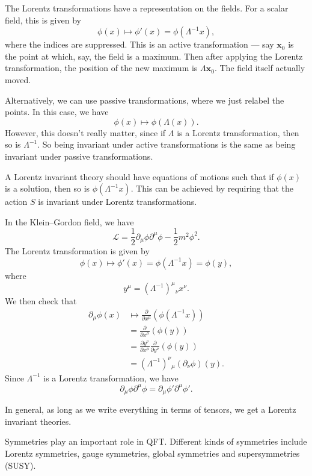 \documentclass[a4paper]{article}
\begin{document}
The Lorentz transformations have a representation on the fields. For a scalar field, this is given by
\[
  \phi(x) \mapsto \phi'(x) = \phi(\Lambda^{-1}x),
\]
where the indices are suppressed. This is an active transformation --- say $\mathbf{x}_0$ is the point at which, say, the field is a maximum. Then after applying the Lorentz transformation, the position of the new maximum is $\Lambda \mathbf{x}_0$. The field itself actually moved.

Alternatively, we can use passive transformations, where we just relabel the points. In this case, we have
\[
  \phi(x) \mapsto \phi(\Lambda (x)).
\]
However, this doesn't really matter, since if $\Lambda$ is a Lorentz transformation, then so is $\Lambda^{-1}$. So being invariant under active transformations is the same as being invariant under passive transformations.

A Lorentz invariant theory should have equations of motions such that if $\phi(x)$ is a solution, then so is $\phi(\Lambda^{-1} x)$. This can be achieved by requiring that the action $S$ is invariant under Lorentz transformations.

\begin{eg}
  In the Klein--Gordon field, we have
  \[
    \mathcal{L} = \frac{1}{2} \partial_\mu \phi \partial^\mu \phi - \frac{1}{2}m^2 \phi^2.
  \]
  The Lorentz transformation is given by
  \[
    \phi(x) \mapsto \phi'(x) = \phi(\Lambda^{-1}x) = \phi(y),
  \]
  where
  \[
    y^\mu = (\Lambda^{-1})^\mu\!_\nu x^\nu.
  \]
  We then check that
  \begin{align*}
    \partial_\mu \phi(x) &\mapsto \frac{\partial}{\partial x^\mu}(\phi(\Lambda^{-1}x)) \\
    &= \frac{\partial}{\partial x^\mu} (\phi(y))\\
    &= \frac{\partial y^\nu}{\partial x^\mu} \frac{\partial}{\partial y^\nu} (\phi(y))\\
    &= (\Lambda^{-1})^\nu\!_\mu(\partial_\nu \phi)(y).
  \end{align*}
  Since $\Lambda^{-1}$ is a Lorentz transformation, we have
  \[
    \partial_\mu \phi \partial^\mu \phi = \partial_\mu \phi' \partial^\mu \phi'.
  \]
\end{eg}
In general, as long as we write everything in terms of tensors, we get a Lorentz invariant theories.

Symmetries play an important role in QFT. Different kinds of symmetries include Lorentz symmetries, gauge symmetries, global symmetries and supersymmetries (SUSY).
\end{document}
